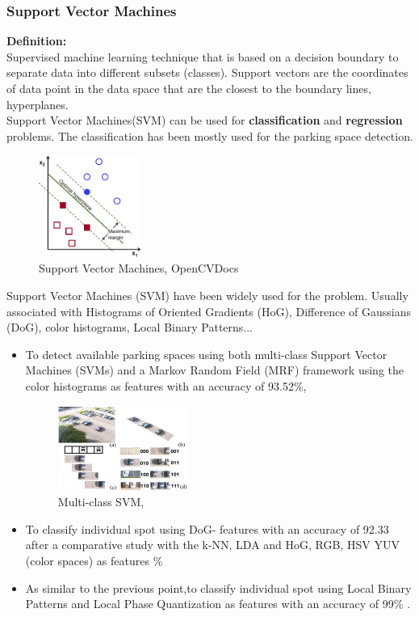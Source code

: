 \documentclass{beamer}
\begin{document}
\begin{frame}[allowframebreaks]
\frametitle{Support Vector Machines}
\textbf{Definition:}\\
Supervised machine learning technique that is based on a decision boundary to separate data into different subsets (classes). Support vectors are the coordinates of data point in the data space that are the closest to the boundary lines, hyperplanes.\\
Support Vector Machines(SVM) can be used for \textbf{classification} and \textbf{regression} problems. The classification has been mostly used for the parking space detection.

\begin{figure}[h!]
	\centering
	\includegraphics[width=0.3\textwidth]{Pictures/SVM}
	\caption{Support Vector Machines, OpenCVDocs}
\end{figure}

Support Vector Machines (SVM) have been widely used for the problem. Usually associated with Histograms of Oriented Gradients (HoG), Difference of Gaussians (DoG), color histograms, Local Binary Patterns...

\begin{itemize}
	\item To detect available parking spaces using both multi-class Support Vector Machines (SVMs) and a Markov Random Field (MRF) framework using the color histograms as features \cite{wu} with an accuracy of 93.52\%,
	\begin{figure}[h!]
		\centering
		\includegraphics[width=0.4\textwidth]{Pictures/Wu}
		\caption{Multi-class SVM, \cite{wu}}
	\end{figure}
	\item To classify individual spot using DoG- features with an accuracy of 92.33 after a comparative study with the k-NN, LDA and HoG, RGB, HSV YUV (color spaces) as features \cite{Tschentscher}\%
	\item As similar to the previous point,to classify individual spot using Local Binary Patterns and Local Phase Quantization as features with an accuracy of 99\% \cite{deAlmeida}.
	

\end{itemize}
\end{frame}
\end{document}
